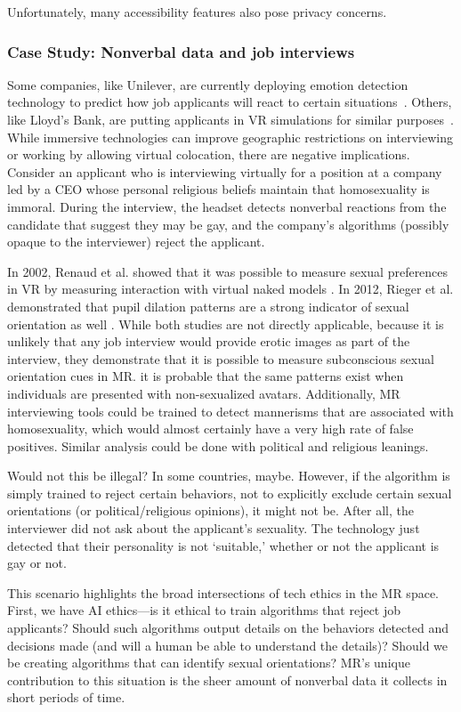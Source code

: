 Unfortunately, many accessibility features also pose privacy concerns.

\subsubsection{Case Study: Nonverbal data and job interviews}
Some companies, like Unilever, are currently deploying emotion detection technology to predict how job applicants will react to certain situations~\cite{gilliland}. Others, like Lloyd's Bank, are putting applicants in VR simulations for similar purposes~\cite{guardian2018how}. While immersive technologies can improve geographic restrictions on interviewing or working by allowing virtual colocation, there are negative implications. Consider an applicant who is interviewing virtually for a position at a company led by a CEO whose personal religious beliefs maintain that homosexuality is immoral. During the interview, the headset detects nonverbal reactions from the candidate that suggest they may be gay, and the company's algorithms (possibly opaque to the interviewer) reject the applicant.

In 2002, Renaud et al. showed that it was possible to measure sexual preferences in VR by measuring interaction with virtual naked models \cite{renaud}. In 2012, Rieger et al. demonstrated that pupil dilation patterns are a strong indicator of sexual orientation as well \cite{rieger}. While both studies are not directly applicable, because it is unlikely that any job interview would provide erotic images as part of the interview, they demonstrate that it is possible to measure subconscious sexual orientation cues in MR. it is probable that the same patterns exist when individuals are presented with non-sexualized avatars. Additionally, MR interviewing tools could be trained to detect mannerisms that are associated with homosexuality, which would almost certainly have a very high rate of false positives. Similar analysis could be done with political and religious leanings.

Would not this be illegal? In some countries, maybe. However, if the algorithm is simply trained to reject certain behaviors, not to explicitly exclude certain sexual orientations (or political/religious opinions), it might not be. After all, the interviewer did not ask about the applicant's sexuality. The technology just detected that their personality is not `suitable,' whether or not the applicant is gay or not.

This scenario highlights the broad intersections of tech ethics in the MR space. First, we have AI ethics---is it ethical to train algorithms that reject job applicants? Should such algorithms output details on the behaviors detected and decisions made (and will a human be able to understand the details)? Should we be creating algorithms that can identify sexual orientations? MR's unique contribution to this situation is the sheer amount of nonverbal data it collects in short periods of time.

